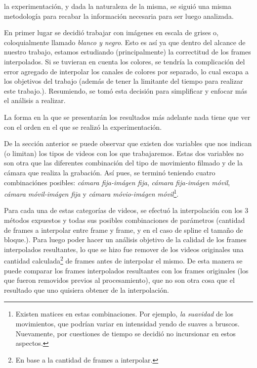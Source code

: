  la experimentaci\'on, y dada la naturaleza de la misma,
se sigui\'o una misma metodolog\'ia para recabar la informaci\'on necesaria para
ser luego analizada.

\par En primer lugar se decidi\'o trabajar con im\'agenes en escala de grises o,
coloquialmente llamado \emph{blanco y negro}. Esto es as\'i ya que dentro del
alcance de nuestro trabajo, estamos estudiando (principalmente) la correctitud
de los frames interpolados. Si se tuvieran en cuenta los colores, se tendr\'ia
la complicaci\'on del error agregado de interpolar los canales de colores por
separado, lo cual escapa a los objetivos del trabajo (adem\'as de tener la
limitante del tiempo para realizar este trabajo.). Resumiendo, se tom\'o esta
decisi\'on para simplificar y enfocar m\'as el an\'alisis a realizar.

\par La forma en la que se presentar\'an los resultados m\'as adelante nada
tiene que ver con el orden en el que se realiz\'o la experimentaci\'on.

\par De la secci\'on anterior se puede observar que existen dos variables que
nos indican (o limitan) los tipos de videos con los que trabajaremos. Estas dos
variables no son otra que las diferentes combinaci\'on del tipo de movimiento
filmado y de la c\'amara que realiza la grabaci\'on. As\'i pues, se termin\'o
teniendo cuatro combinaci\'ones posibles: \emph{c\'amara fija-im\'agen fija},
\emph{c\'amara fija-im\'agen m\'ovil}, \emph{c\'amara m\'ovil-im\'agen fija} y
\emph{c\'amara m\'ovio-im\'agen m\'ovil}\footnote{Existen matices en estas
combinaciones. Por ejemplo, \emph{la suavidad} de los movimientos, que podr\'ian
variar en intensidad yendo de suaves a bruscos. Nuevamente, por cuestiones de
tiempo se decidi\'o no incursionar en estos aspectos.}.

\par Para cada una de estas categor\'ias de videos, se efectu\'o la
interpolaci\'on con los 3 m\'etodos expuestos y todas sus posibles combinaciones
de par\'ametros (cantidad de frames a interpolar entre frame y frame, y en el
caso de spline el tama\~no de bloque.). Para luego poder hacer un an\'alisis
objetivo de la calidad de los frames interpolados resultantes, lo que se hizo
fue remover de los videos originales una cantidad calculada\footnote{En base
a la cantidad de frames a interpolar.} de frames antes de interpolar el mismo.
De esta manera se puede comparar los frames interpolados resultantes con los
frames originales (los que fueron removidos previos al procesamiento), que no
son otra cosa que el resultado que uno quisiera obtener de la interpolaci\'on.

